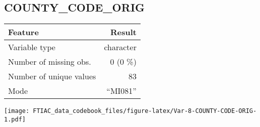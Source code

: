 \documentclass[]{article}
\newcommand{\fullline}{\noindent\makebox[\linewidth]{\rule{\textwidth}{0.4pt}}}
\newcommand{\bminione}{\begin{minipage}{0.75 \textwidth}}
\newcommand{\bminitwo}{\begin{minipage}{0.25 \textwidth}}
\newcommand{\emini}{\end{minipage}}
\begin{document}
\fullline

\hypertarget{county_code_orig}{\subsection{COUNTY\_CODE\_ORIG}\label{county_code_orig}}

\bminione

\begin{longtable}[]{@{}lr@{}}
\toprule
\begin{minipage}[b]{0.34\columnwidth}\raggedright\strut
Feature\strut
\end{minipage} & \begin{minipage}[b]{0.14\columnwidth}\raggedleft\strut
Result\strut
\end{minipage}\tabularnewline
\midrule
\endhead
\begin{minipage}[t]{0.34\columnwidth}\raggedright\strut
Variable type\strut
\end{minipage} & \begin{minipage}[t]{0.14\columnwidth}\raggedleft\strut
character\strut
\end{minipage}\tabularnewline
\begin{minipage}[t]{0.34\columnwidth}\raggedright\strut
Number of missing obs.\strut
\end{minipage} & \begin{minipage}[t]{0.14\columnwidth}\raggedleft\strut
0 (0 \%)\strut
\end{minipage}\tabularnewline
\begin{minipage}[t]{0.34\columnwidth}\raggedright\strut
Number of unique values\strut
\end{minipage} & \begin{minipage}[t]{0.14\columnwidth}\raggedleft\strut
83\strut
\end{minipage}\tabularnewline
\begin{minipage}[t]{0.34\columnwidth}\raggedright\strut
Mode\strut
\end{minipage} & \begin{minipage}[t]{0.14\columnwidth}\raggedleft\strut
``MI081''\strut
\end{minipage}\tabularnewline
\bottomrule
\end{longtable}

\emini
\bminitwo
\texttt{[image: FTIAC\_data\_codebook\_files/figure-latex/Var-8-COUNTY-CODE-ORIG-1.pdf]}
\emini
\end{document}
